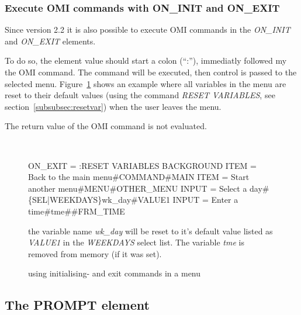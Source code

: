 \documentclass[a4paper]{book}
\renewcommand{\indent}{\hspace*{5mm}}
\begin{document}
\subsubsection{Execute OMI commands with ON{\_}INIT and ON{\_}EXIT}

Since version 2.2 it is also possible to execute OMI commands in the
\textsl{ON{\_}INIT} and
\textsl{ON{\_}EXIT} elements.

To do so, the element value should start a colon (``:''), immediatly followed my the OMI command.
The command will be executed, then control is passed to the selected menu. Figure~\ref{fig:iecmds}
shows an example where all variables in the menu are reset to their default values (using the
command \textsl{RESET VARIABLES}, see section~\ref{subsubsec:resetvar}) when the user leaves the
menu.

The return value of the OMI command is not evaluated.

\begin{figure}[h!tb]
\begin{minipage}[h!tb]{\textwidth}
\hrulefill \\
\begin{ttfamily}\begin{small}
 \newline
\indent ON{\_}EXIT = :RESET VARIABLES BACKGROUND \newline
\indent ITEM  = Back to the main menu{\#}COMMAND{\#}MAIN \newline
\indent ITEM  = Start another menu{\#}MENU{\#}OTHER{\_}MENU \newline
\indent INPUT = Select a day\#\{SEL|WEEKDAYS\}wk\_day\#VALUE1 \newline
\indent INPUT = Enter a time\#tme\#\#FRM\_TIME
\end{small}\end{ttfamily}
\noindent  the variable name \textit{wk\_day} will be reset to it's default value listed as \textit{VALUE1}
in the \textit{WEEKDAYS} select list. The variable \textit{tme} is removed from memory (if it was
set).
\caption{using initialising- and exit commands in a menu}\label{fig:iecmds}
\hrulefill
\end{minipage}
\end{figure}

\subsection{The PROMPT element}
\label{subsubsec:mylabel23}
\end{document}
